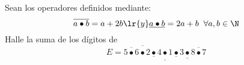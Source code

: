 Sean los operadores definidos mediante:
\[ \overline{a\bullet b}=a+2b \lr{ y } \underline{a\bullet b}=2a+b \hspace{0.2cm}\forall a,b\in\N\]
Halle la suma de los dígitos de
\[ E=\underline{\overline{\overline{5\bullet 6}\bullet\underline{2\bullet 4}}\bullet\underline{\underline{1\bullet 3}\bullet\overline{8\bullet 7}}} \]
